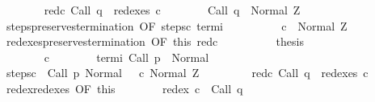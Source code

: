 \begin{isabellebody}
\ \ \ \ \ \ \isamarkupfalse%
\ red{\isacharunderscore}c{\isacharprime}{\isacharcolon}\ {\isachardoublequoteopen}Call\ q\ {\isasymin}\ redexes\ c{\isacharprime}{\isachardoublequoteclose}\isanewline
\ \ \ \ \ \ \isamarkupfalse%
\ {\isachardoublequoteopen}{\isasymGamma}{\isasymturnstile}Call\ q\ {\isasymdown}\ Normal\ Z{\isachardoublequoteclose}\isanewline
\ \ \ \ \ \ \isamarkupfalse%
\ {\isacharminus}\isanewline
\ \ \ \ \ \ \ \ \isamarkupfalse%
\ steps{\isacharunderscore}preserves{\isacharunderscore}termination{\isacharprime}\ {\isacharbrackleft}OF\ steps{\isacharunderscore}c{\isacharprime}\ termi{\isacharbrackright}\isanewline
\ \ \ \ \ \ \ \ \isamarkupfalse%
\ {\isachardoublequoteopen}{\isasymGamma}{\isasymturnstile}c{\isacharprime}\ {\isasymdown}\ Normal\ Z{\isachardoublequoteclose}\ \isacommand{{\isachardot}}\isamarkupfalse%
\isanewline
\ \ \ \ \ \ \ \ \isamarkupfalse%
\ redexes{\isacharunderscore}preserves{\isacharunderscore}termination\ {\isacharbrackleft}OF\ this\ red{\isacharunderscore}c{\isacharprime}{\isacharbrackright}\isanewline
\ \ \ \ \ \ \ \ \isamarkupfalse%
\ {\isacharquery}thesis\ \isacommand{{\isachardot}}\isamarkupfalse%
\isanewline
\ \ \ \ \ \ \isamarkupfalse%
\isanewline
\ \ \ \ \isamarkupfalse%
\isanewline
\ \ \ \ \ \ \isamarkupfalse%
\ c{\isacharprime}\isanewline
\ \ \ \ \ \ \isamarkupfalse%
\ termi{\isacharcolon}\ {\isachardoublequoteopen}{\isasymGamma}{\isasymturnstile}Call\ p\ {\isasymdown}\ Normal\ {\isasymsigma}{\isachardoublequoteclose}\isanewline
\ \ \ \ \ \ \isamarkupfalse%
\ steps{\isacharunderscore}c{\isacharprime}{\isacharcolon}\ {\isachardoublequoteopen}{\isasymGamma}{\isasymturnstile}\ {\isacharparenleft}Call\ p{\isacharcomma}\ Normal\ {\isasymsigma}{\isacharparenright}\ {\isasymrightarrow}\isactrlsup {\isacharplus}\ {\isacharparenleft}c{\isacharprime}{\isacharcomma}\ Normal\ Z{\isacharparenright}{\isachardoublequoteclose}\ \isanewline
\ \ \ \ \ \ \isamarkupfalse%
\ red{\isacharunderscore}c{\isacharprime}{\isacharcolon}\ {\isachardoublequoteopen}Call\ q\ {\isasymin}\ redexes\ c{\isacharprime}{\isachardoublequoteclose}\isanewline
\ \ \ \ \ \ \isamarkupfalse%
\ redex{\isacharunderscore}redexes\ {\isacharbrackleft}OF\ this{\isacharbrackright}\isanewline
\ \ \ \ \ \ \isamarkupfalse%
\ {\isachardoublequoteopen}redex\ c{\isacharprime}\ {\isacharequal}\ Call\ q{\isachardoublequoteclose}\isanewline

\end{isabellebody}
